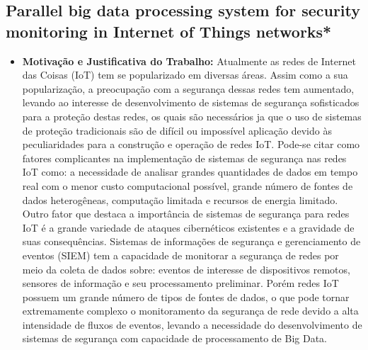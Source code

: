 \documentclass[tid,table]{texufpel} %
\begin{document}
\subsection{Parallel big data processing system for security monitoring in Internet of Things networks*}

\begin{itemize}
	\item \textbf{Motivação e Justificativa do Trabalho:} Atualmente as redes de Internet das Coisas (IoT) tem se popularizado em diversas áreas. Assim como a sua popularização, a preocupação com a segurança dessas redes tem aumentado, levando ao interesse de desenvolvimento de sistemas de segurança sofisticados para a proteção destas redes, os quais são necessários ja que o uso de sistemas de proteção tradicionais são de difícil ou impossível aplicação devido às peculiaridades para a construção e operação de redes IoT. Pode-se citar como fatores complicantes na implementação de sistemas de segurança nas redes IoT como: a necessidade de analisar grandes quantidades de dados em tempo real com o menor custo computacional possível, grande número de fontes de dados heterogêneas, computação limitada e recursos de energia limitado. Outro fator que destaca a importância de sistemas de segurança para redes IoT é a grande variedade de ataques cibernéticos existentes e a gravidade de suas consequências. Sistemas de informações de segurança e gerenciamento de eventos (SIEM) tem a capacidade de monitorar a segurança de redes por meio da coleta de dados sobre: eventos de interesse de dispositivos remotos, sensores de informação e seu processamento preliminar. Porém redes IoT possuem um grande número de tipos de fontes de dados, o que pode tornar extremamente complexo o monitoramento da segurança de rede devido a alta intensidade de fluxos de eventos, levando a necessidade do desenvolvimento de sistemas de segurança com capacidade de processamento de Big Data.
	

\end{itemize}
\end{document}
